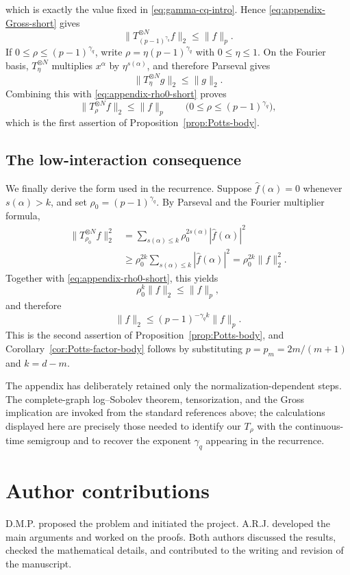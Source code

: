 \documentclass[11pt,a4paper]{article}
\numberwithin{equation}{section}
\theoremstyle{cleanplain}
\theoremstyle{cleandefinition}
\theoremstyle{cleanremark}
\begin{document}
{\[\]
which is exactly the value fixed in \eqref{eq:gamma-cq-intro}.  Hence
\eqref{eq:appendix-Gross-short} gives
\begin{equation}\label{eq:appendix-rho0-short}
 \|T_{(p-1)^{\gamma_q}}^{\otimes N}f\|_2\leq\|f\|_p.
\end{equation}
If $0\leq\rho\leq(p-1)^{\gamma_q}$, write
$\rho=\eta(p-1)^{\gamma_q}$ with $0\leq\eta\leq1$.  On the Fourier basis,
$T_\eta^{\otimes N}$ multiplies $x^\alpha$ by $\eta^{s(\alpha)}$, and
therefore Parseval gives
\[
 \|T_\eta^{\otimes N}g\|_2\leq\|g\|_2.
\]
Combining this with \eqref{eq:appendix-rho0-short} proves
\[
 \|T_\rho^{\otimes N}f\|_2\leq\|f\|_p
 \qquad
 \bigl(0\leq\rho\leq(p-1)^{\gamma_q}\bigr),
\]
which is the first assertion of Proposition~\ref{prop:Potts-body}.

\subsection{The low-interaction consequence}

We finally derive the form used in the recurrence.  Suppose
$\widehat f(\alpha)=0$ whenever $s(\alpha)>k$, and set
$\rho_0=(p-1)^{\gamma_q}$.  By Parseval and the Fourier multiplier formula,
\begin{align*}
 \|T_{\rho_0}^{\otimes N}f\|_2^2
 &=\sum_{s(\alpha)\leq k}
   \rho_0^{2s(\alpha)}|\widehat f(\alpha)|^2\\
 &\geq \rho_0^{2k}
   \sum_{s(\alpha)\leq k}|\widehat f(\alpha)|^2
 =\rho_0^{2k}\|f\|_2^2.
\end{align*}
Together with \eqref{eq:appendix-rho0-short}, this yields
\[
 \rho_0^k\|f\|_2\leq\|f\|_p,
\]
and therefore
\[
 \|f\|_2
 \leq(p-1)^{-\gamma_qk}\|f\|_p.
\]
This is the second assertion of Proposition~\ref{prop:Potts-body}, and
Corollary~\ref{cor:Potts-factor-body} follows by substituting
$p=p_m=2m/(m+1)$ and $k=d-m$.

The appendix has deliberately retained only the normalization-dependent
steps.  The complete-graph log--Sobolev theorem, tensorization, and the
Gross implication are invoked from the standard references above; the
calculations displayed here are precisely those needed to identify our
$T_\rho$ with the continuous-time semigroup and to recover the exponent
$\gamma_q$ appearing in the recurrence.
}



\section*{Author contributions}
D.M.P. proposed the problem and initiated the project.  A.R.J. developed the
main arguments and worked on the proofs.  Both authors discussed the results,
checked the mathematical details, and contributed to the writing and revision
of the manuscript.
\end{document}
